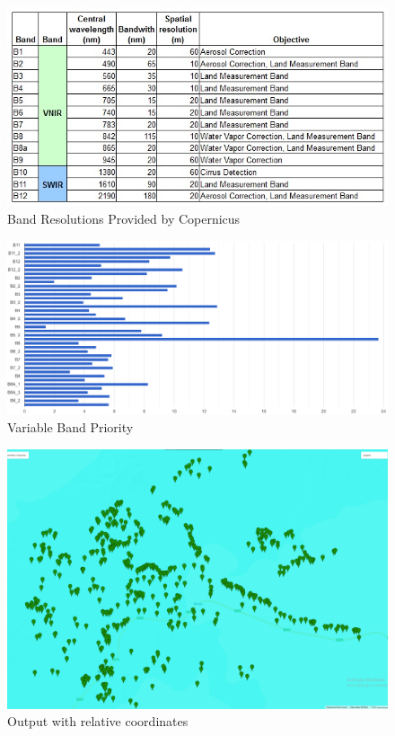 \documentclass{article}
\begin{document}
\begin{figure}[H]
    \centering
    \includegraphics[width=1\linewidth]{images/copernicus_band_resolution.png}
    \caption{Band Resolutions Provided by Copernicus}
    \label{fig:cop_bands_chart}
\end{figure}

\begin{figure}[H]
    \centering
    \includegraphics[width=1\linewidth]{images/bands importance.png}
    \caption{Variable Band Priority}
    \label{fig:band_importance}
\end{figure}

\begin{figure}[H]
\centering
    \includegraphics[width=1\linewidth]{images/cv_output.png}
    \caption{Output with relative coordinates}
    \label{fig:OutputOnSample}
\end{figure}
\end{document}
